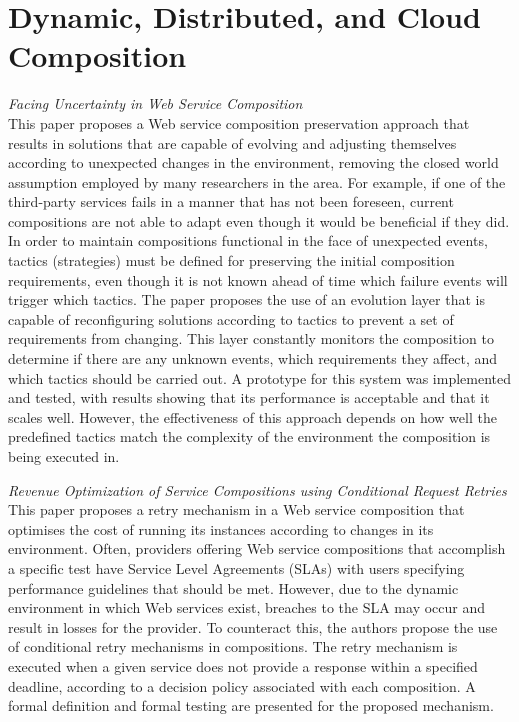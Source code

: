 \section{Dynamic, Distributed, and Cloud Composition}
\textit{Facing Uncertainty in Web Service Composition \cite{alferez2013facing}}\\
This paper proposes a Web service composition preservation approach that results in solutions that are capable of evolving and adjusting themselves according
to unexpected changes in the environment, removing the closed world assumption employed by many researchers in the area. For example, if one of
the third-party services fails in a manner that has not been foreseen, current compositions are not able to adapt even though it would be beneficial
if they did. In order to maintain compositions functional in the face of unexpected events, tactics (strategies) must be defined for preserving
the initial composition requirements, even though it is not known ahead of time which failure events will trigger which tactics. The paper proposes
the use of an evolution layer that is capable of reconfiguring solutions according to tactics to prevent a set of requirements from changing. This
layer constantly monitors the composition to determine if there are any unknown events, which requirements they affect, and which tactics should be
carried out. A prototype for this system was implemented and tested, with results showing that its performance is acceptable and that it scales well.
However, the effectiveness of this approach depends on how well the predefined tactics match the complexity of the environment the composition is
being executed in.

\textit{Revenue Optimization of Service Compositions using Conditional Request Retries \cite{berg2013revenue}}\\
This paper proposes a retry mechanism in a Web service composition that optimises the cost of running its instances according to changes in its environment.
Often, providers offering Web service compositions that accomplish a specific test have Service Level Agreements (SLAs) with users specifying performance
guidelines that should be met. However, due to the dynamic environment in which Web services exist, breaches to the SLA may occur and result in losses
for the provider. To counteract this, the authors propose the use of conditional retry mechanisms in compositions. The retry mechanism is executed when
a given service does not provide a response within a specified deadline, according to a decision policy associated with each composition. A formal definition
and formal testing are presented for the proposed mechanism.

